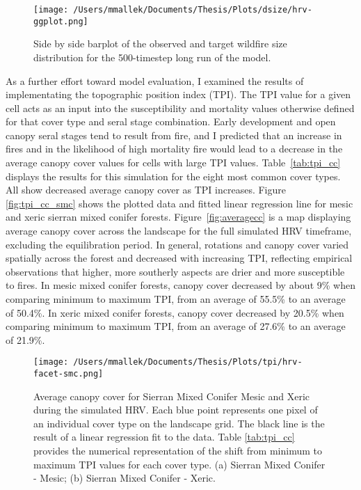 \begin{figure}[!htbp]
  \centering
    \centering
    \texttt{[image: /Users/mmallek/Documents/Thesis/Plots/dsize/hrv-ggplot.png]}
  \caption{Side by side barplot of the observed and target wildfire size distribution for the 500-timestep long run of the model.}
  \label{fig:dsize}
\end{figure}

As a further effort toward model evaluation, I examined the results of implementating the topographic position index (TPI). The TPI value for a given cell acts as an input into the susceptibility and mortality values otherwise defined for that cover type and seral stage combination. Early development and open canopy seral stages tend to result from fire, and I predicted that an increase in fires and in the likelihood of high mortality fire would lead to a decrease in the average canopy cover values for cells with large TPI values. Table~\ref{tab:tpi_cc} displays the results for this simulation for the eight most common cover types. All show decreased average canopy cover as TPI increases. Figure \ref{fig:tpi_cc_smc} shows the plotted data and fitted linear regression line for mesic and xeric sierran mixed conifer forests. Figure~\ref{fig:averagecc} is a map displaying average canopy cover across the landscape for the full simulated HRV timeframe, excluding the equilibration period. In general, rotations and canopy cover varied spatially across the forest and decreased with increasing TPI, reflecting empirical observations that higher, more southerly aspects are drier and more susceptible to fires. In mesic mixed conifer forests, canopy cover decreased by about 9\% when comparing minimum to maximum TPI, from an average of 55.5\% to an average of 50.4\%. In xeric mixed conifer forests, canopy cover decreased by 20.5\% when comparing minimum to maximum TPI, from an average of 27.6\% to an average of 21.9\%.


\begin{figure}[!htbp]
\centering
\texttt{[image: /Users/mmallek/Documents/Thesis/Plots/tpi/hrv-facet-smc.png]}
\caption{Average canopy cover for Sierran Mixed Conifer Mesic and Xeric during the simulated HRV. Each blue point represents one pixel of an individual cover type on the landscape grid. The black line is the result of a linear regression fit to the data. Table \ref{tab:tpi_cc} provides the numerical representation of the shift from minimum to maximum TPI values for each cover type. (a) Sierran Mixed Conifer - Mesic; (b) Sierran Mixed Conifer - Xeric.}
\label{fig:tpi_cc_smcs}
\end{figure}

